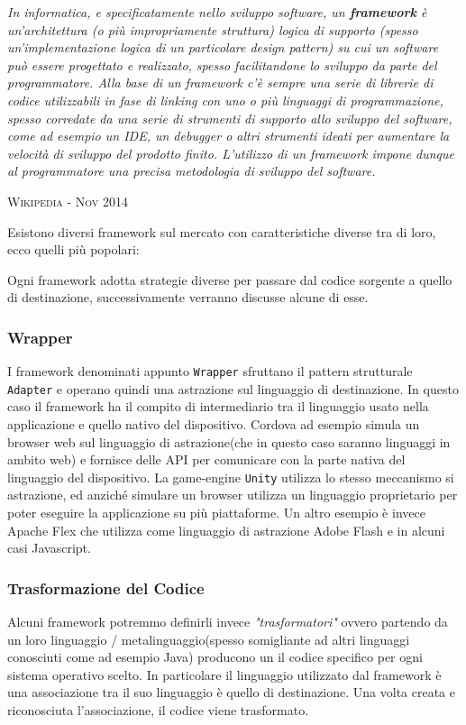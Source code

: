 \textit{In informatica, e specificatamente nello sviluppo software, un \textbf{framework} è un'architettura (o più impropriamente struttura) logica di supporto (spesso un'implementazione logica di un particolare design pattern) su cui un software può essere progettato e realizzato, spesso facilitandone lo sviluppo da parte del programmatore. Alla base di un framework c'è sempre una serie di librerie di codice utilizzabili in fase di linking con uno o più linguaggi di programmazione, spesso corredate da una serie di strumenti di supporto allo sviluppo del software, come ad esempio un IDE, un debugger o altri strumenti ideati per aumentare la velocità di sviluppo del prodotto finito. L'utilizzo di un framework impone dunque al programmatore una precisa metodologia di sviluppo del software.}

\textsc{Wikipedia - Nov 2014}

Esistono diversi framework sul mercato con caratteristiche diverse tra di loro, ecco quelli più popolari:


Ogni framework adotta strategie diverse per passare dal codice sorgente a quello di destinazione, successivamente verranno discusse alcune di esse.

\subsubsection{Wrapper}
I framework denominati appunto \texttt{Wrapper} sfruttano il pattern strutturale \texttt{Adapter} e operano quindi una astrazione sul linguaggio di destinazione. In questo caso il framework ha il compito di intermediario tra il linguaggio usato nella applicazione e quello nativo del dispositivo.
Cordova ad esempio simula un browser web sul linguaggio di astrazione(che in questo caso saranno linguaggi in ambito web) e fornisce delle API per comunicare con la parte nativa del linguaggio del dispositivo.
La game-engine \texttt{Unity} utilizza lo stesso meccanismo si astrazione, ed anziché simulare un browser utilizza un linguaggio proprietario per poter eseguire la applicazione su più piattaforme.
Un altro esempio è invece Apache Flex che utilizza come linguaggio di astrazione Adobe Flash e in alcuni casi Javascript.
\subsubsection{Trasformazione del Codice}
Alcuni framework potremmo definirli invece \emph{"trasformatori"} ovvero partendo da un loro linguaggio / metalinguaggio(spesso somigliante ad altri linguaggi conosciuti come ad esempio Java) producono un il codice specifico per ogni sistema operativo scelto.
In particolare il linguaggio utilizzato dal framework è una associazione tra il suo linguaggio è quello di destinazione. Una volta creata e riconosciuta l'associazione, il codice viene trasformato.
